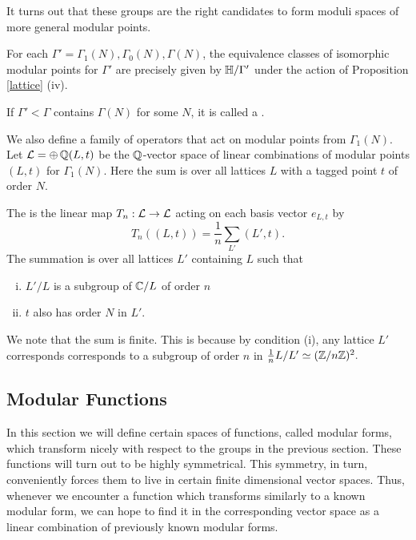 \documentclass[12pt, a4paper]{amsart}
\begin{document}
It turns out that these groups are the right candidates to form moduli spaces of
more general modular points.

\begin{prop}
  For each $\Gamma' = \Gamma_1(N), \Gamma_0(N), \Gamma(N)$, the equivalence
  classes of isomorphic modular points for $\Gamma'$ are precisely given by
  $\mathbb{H}/\Gamma'$ under the action of Proposition \autoref{lattice} (iv).
\end{prop}
If $\Gamma' < \Gamma$ contains $\Gamma(N)$ for some $N$, it is called a
.

We also define a family of operators that act on modular points from
$\Gamma_1(N)$. Let $\mathcal{L} = \oplus \, {\mathbb Q} (L,t)$ be the ${\mathbb Q}$-vector space
of linear combinations of modular points $(L,t)$ for $\Gamma_1(N).$ Here the sum is over
all lattices $L$ with a tagged point $t$ of order $N$.

\begin{defn} \label{hecke}
  The  is the linear map $T_n : \mathcal{L} \rightarrow \mathcal{L}$ acting
  on each basis vector $e_{L,t}$ by
  \[T_n((L,t)) = \frac{1}{n} \sum\limits_{L'} (L',t).\]
  The summation is over all lattices $L'$ containing $L$ such that
  \begin{enumerate}[(i)]
  \item $L'/L$ is a subgroup of ${\mathbb C}/L$ of order $n$
  \item $t$ also has order $N$ in $L'$.
  \end{enumerate}
  We note that the sum is finite. This is because by condition (i), any lattice $L'$
  corresponds corresponds to a subgroup
  of order $n$ in $\frac{1}{n} L/L' \simeq ({\mathbb Z}/n{\mathbb Z})^2.$
\end{defn}

\subsection{Modular Functions}

In this section we will define certain spaces of functions, called modular forms,
which transform
nicely with respect to the groups in the previous section. These functions will
turn out to be highly symmetrical. This symmetry, in turn, conveniently forces
them to live
in certain finite dimensional vector spaces. Thus, whenever we encounter a
function which transforms similarly to a known modular form, we can hope to find
it in the corresponding vector space as a linear combination of previously known
modular forms.
\end{document}
